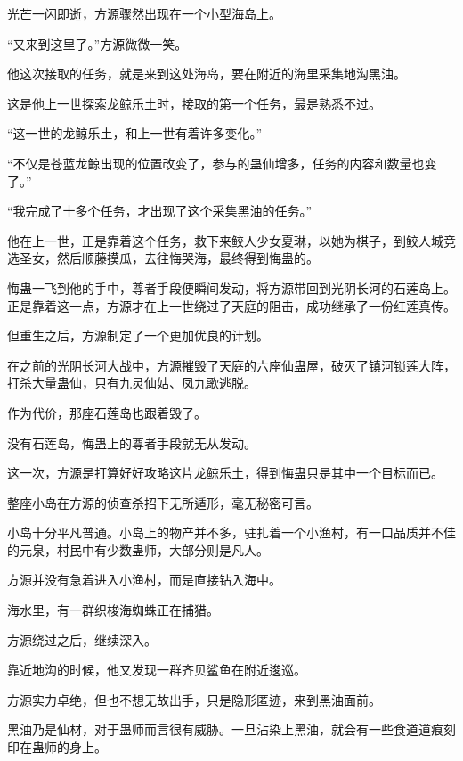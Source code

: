 
\begin{this_body}



光芒一闪即逝，方源骤然出现在一个小型海岛上。

“又来到这里了。”方源微微一笑。

他这次接取的任务，就是来到这处海岛，要在附近的海里采集地沟黑油。

这是他上一世探索龙鲸乐土时，接取的第一个任务，最是熟悉不过。

“这一世的龙鲸乐土，和上一世有着许多变化。”

“不仅是苍蓝龙鲸出现的位置改变了，参与的蛊仙增多，任务的内容和数量也变了。”

“我完成了十多个任务，才出现了这个采集黑油的任务。”

他在上一世，正是靠着这个任务，救下来鲛人少女夏琳，以她为棋子，到鲛人城竞选圣女，然后顺藤摸瓜，去往悔哭海，最终得到悔蛊的。

悔蛊一飞到他的手中，尊者手段便瞬间发动，将方源带回到光阴长河的石莲岛上。正是靠着这一点，方源才在上一世绕过了天庭的阻击，成功继承了一份红莲真传。

但重生之后，方源制定了一个更加优良的计划。

在之前的光阴长河大战中，方源摧毁了天庭的六座仙蛊屋，破灭了镇河锁莲大阵，打杀大量蛊仙，只有九灵仙姑、凤九歌逃脱。

作为代价，那座石莲岛也跟着毁了。

没有石莲岛，悔蛊上的尊者手段就无从发动。

这一次，方源是打算好好攻略这片龙鲸乐土，得到悔蛊只是其中一个目标而已。

整座小岛在方源的侦查杀招下无所遁形，毫无秘密可言。

小岛十分平凡普通。小岛上的物产并不多，驻扎着一个小渔村，有一口品质并不佳的元泉，村民中有少数蛊师，大部分则是凡人。

方源并没有急着进入小渔村，而是直接钻入海中。

海水里，有一群织梭海蜘蛛正在捕猎。

方源绕过之后，继续深入。

靠近地沟的时候，他又发现一群齐贝鲨鱼在附近逡巡。

方源实力卓绝，但也不想无故出手，只是隐形匿迹，来到黑油面前。

黑油乃是仙材，对于蛊师而言很有威胁。一旦沾染上黑油，就会有一些食道道痕刻印在蛊师的身上。


\end{this_body}
